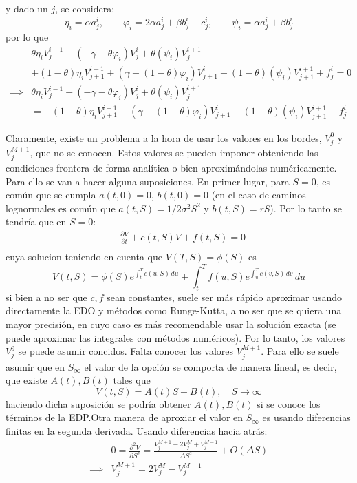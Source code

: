 y dado un $j$, se considera:
\begin{equation*}
    \eta_i = \alpha a_j^i, \qquad \varphi_i = 2\alpha a_j^i  + \beta b_j^i - c_j^i, \qquad \psi_i = \alpha a_j^i + \beta b_j^i
\end{equation*}
por lo que
\begin{align*}
    &\theta\eta_i V_j^{i-1} +\left( -\gamma - \theta \varphi_i \right)V_j^i +\theta\left( \psi_i \right)V_j^{i+1} \\
    &+(1-\theta)\eta_i V_{j+1}^{i-1} +\left( \gamma - (1-\theta) \varphi_i \right)V_{j+1}^i +(1-\theta)\left( \psi_i \right)V_{j+1}^{i+1} + f_j^i = 0 \\
    \implies &\theta\eta_i V_j^{i-1} +\left( -\gamma - \theta \varphi_i \right)V_j^i +\theta\left( \psi_i \right)V_j^{i+1} \\
    &= - (1-\theta)\eta_i V_{j+1}^{i-1} -\left( \gamma - (1-\theta) \varphi_i \right)V_{j+1}^i - (1-\theta)\left( \psi_i \right)V_{j+1}^{i+1} - f_j^i 
\end{align*}

Claramente, existe un problema a la hora de usar los valores en los bordes, $V_j^0$ y $V_j^{M+1}$, que no se conocen. Estos valores se pueden imponer obteniendo las condiciones frontera de forma analítica o bien aproximándolas numéricamente. Para ello se van a hacer alguna suposiciones. En primer lugar, para $S=0$, es común que se cumpla $a(t, 0)=0$, $b(t, 0)=0$ (en el caso de caminos lognormales es común que $a(t, S)=1/2\sigma^2S^2$ y $b(t,S)=rS$). Por lo tanto se tendría que en $S=0$:
\begin{align*}
    &\frac{\partial V}{\partial t} + c(t, S) V + f(t, S) = 0 \\
\end{align*}
cuya solucion teniendo en cuenta que $V(T,S)=\phi(S)$ es
\begin{equation*}
    V(t, S) = \phi(S) e^{\int_t^T c(u, S)\,du} + \int_t^T f(u, S) e^{\int_u^T c(v, S)\,dv}\,du
\end{equation*}
si bien a no ser que $c, f$ sean constantes, suele ser más rápido aproximar usando directamente la EDO y métodos como Runge-Kutta, a no ser que se quiera una mayor precisión, en cuyo caso es más recomendable usar la solución exacta (se puede aproximar las integrales con métodos numéricos). Por lo tanto, los valores $V_j^0$ se puede asumir concidos. Falta conocer los valores $V_j^{M+1}$. Para ello se suele asumir que en $S_\infty$ el valor de la opción se comporta de manera lineal, es decir, que existe $A(t), B(t)$ tales que
\begin{equation*}
    V(t, S) = A(t) S + B(t), \quad S \to \infty
\end{equation*}
haciendo dicha suposición se podría obtener $A(t), B(t)$ si se conoce los términos de la EDP.\@ Otra manera de aproxiar el valor en $S_\infty$ es usando diferencias finitas en la segunda derivada. Usando diferencias hacia atrás:
\begin{align*}
    &0 = \frac{\partial^2 V}{\partial S^2} = \frac{V_j^{M+1} - 2V_j^{M} + V_j^{M-1}}{\Delta S^2} + O(\Delta S) \\
    \implies &V_j^{M+1} = 2V_j^{M} - V_j^{M-1}
\end{align*}

